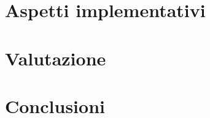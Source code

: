 \documentclass[10pt,a4paper]{article}
\begin{document}
\section{Aspetti implementativi}

\section{Valutazione}

\section{Conclusioni}
\end{document}
